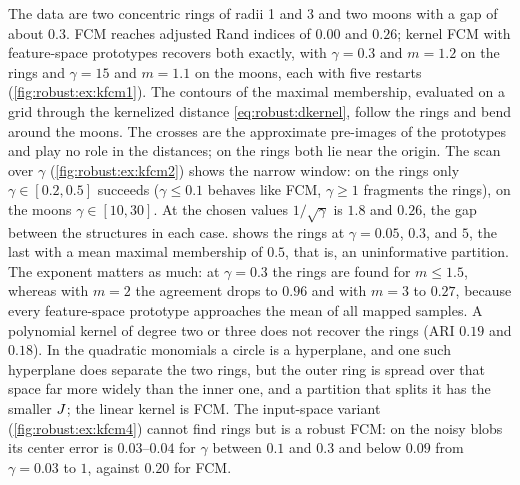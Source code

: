 The data are two concentric rings of radii 1 and 3 and two moons with a gap of about $0.3$. FCM reaches adjusted Rand indices of $0.00$ and $0.26$; kernel FCM with feature-space prototypes recovers both exactly, with $\gamma=0.3$ and $m=1.2$ on the rings and $\gamma=15$ and $m=1.1$ on the moons, each with five restarts (\cref{fig:robust:ex:kfcm1}). The contours of the maximal membership, evaluated on a grid through the kernelized distance \eqref{eq:robust:dkernel}, follow the rings and bend around the moons. The crosses are the approximate pre-images of the prototypes and play no role in the distances; on the rings both lie near the origin. The scan over $\gamma$ (\cref{fig:robust:ex:kfcm2}) shows the narrow window: on the rings only $\gamma\in[0.2,0.5]$ succeeds ($\gamma\le0.1$ behaves like FCM, $\gamma\ge1$ fragments the rings), on the moons $\gamma\in[10,30]$. At the chosen values $1/\sqrt{\gamma}$ is $1.8$ and $0.26$, the gap between the structures in each case.  shows the rings at $\gamma=0.05$, $0.3$, and $5$, the last with a mean maximal membership of $0.5$, that is, an uninformative partition. The exponent matters as much: at $\gamma=0.3$ the rings are found for $m\le1.5$, whereas with $m=2$ the agreement drops to $0.96$ and with $m=3$ to $0.27$, because every feature-space prototype approaches the mean of all mapped samples. A polynomial kernel of degree two or three does not recover the rings (ARI $0.19$ and $0.18$). In the quadratic monomials a circle is a hyperplane, and one such hyperplane does separate the two rings, but the outer ring is spread over that space far more widely than the inner one, and a partition that splits it has the smaller $J$; the linear kernel is FCM. The input-space variant (\cref{fig:robust:ex:kfcm4}) cannot find rings but is a robust FCM: on the noisy blobs its center error is $0.03$--$0.04$ for $\gamma$ between $0.1$ and $0.3$ and below $0.09$ from $\gamma=0.03$ to $1$, against $0.20$ for FCM.


